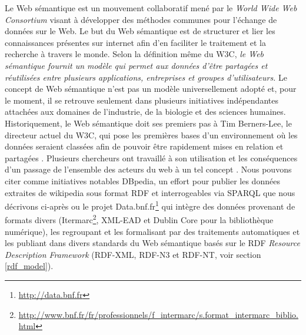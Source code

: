 Le Web sémantique est un mouvement collaboratif mené par le \textit{World Wide Web Consortium} visant à développer des méthodes communes pour l'échange de données sur le Web. Le but du Web sémantique est de structurer et lier les connaissances présentes sur internet afin d'en faciliter le traitement et la recherche à travers le monde. Selon la définition même du W3C, \textit{le Web sémantique fournit un modèle qui permet aux données d'être partagées et réutilisées entre plusieurs applications, entreprises et groupes d'utilisateurs.} Le concept de Web sémantique n'est pas un modèle universellement adopté et, pour le moment, il se retrouve seulement dans plusieurs initiatives indépendantes attachées aux domaines de l'industrie, de la biologie et des sciences humaines. Historiquement, le Web sémantique doit ses premiers pas à Tim Berners-Lee, le directeur actuel du W3C, qui pose les premières bases d'un environnement où les données seraient classées afin de pouvoir être rapidement mises en relation et partagées \cite{berners2001semantic}. Plusieurs chercheurs ont travaillé à son utilisation et les conséquences d'un passage de l'ensemble des acteurs du web à un tel concept \cite{feigenbaum_semantic_2007}. Nous pouvons citer comme initiatives notables DBpedia, un effort pour publier les données extraites de wikipedia sous format RDF et interrogeables via SPARQL que nous décrivons ci-après \cite{auer2007dbpedia} ou le projet Data.bnf.fr\footnote{\url{http://data.bnf.fr}} qui intègre des données provenant de formats divers (Itermarc\footnote{\url{http://www.bnf.fr/fr/professionnels/f_intermarc/s.format_intermarc_biblio.html}}, XML-EAD et Dublin Core \cite{weibel1998dublin} pour la bibliothèque numérique), les regroupant et les formalisant par des traitements automatiques et les publiant dans divers standards du Web sémantique basés sur le RDF \textit{Resource Description Framework} (RDF-XML, RDF-N3 et RDF-NT, voir section \ref{rdf_model}).

